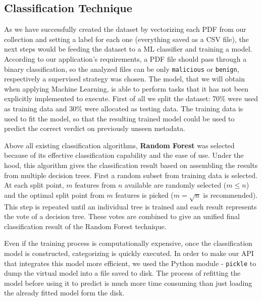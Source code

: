\subsection{Classification Technique}
As we have successfully created the dataset by vectorizing each PDF from our collection and setting a label for each one (everything saved as a CSV file), the next steps would be feeding the dataset to a ML classifier and training a model. According to our application's requirements, a PDF file should pass through a binary classification, so the analyzed files can be only \texttt{malicious} or \texttt{benign}, respectively a supervised strategy was chosen. The model, that we will obtain when applying Machine Learning, is able to perform tasks that it has not been explicitly implemented to execute. First of all we split the dataset: 70\% were used as training data and 30\% were allocated as testing data. The training data is used to fit the model, so that the resulting trained model could be used to predict the correct verdict on previously unseen metadata. \par 
Above all existing classification algorithms, \textbf{Random Forest} was selected because of its effective classification capability and the ease of use. Under the hood, this algorithm gives the classification result based on assembling the results from multiple decision trees. First a random subset from training data is selected. At each split point, $m$ features from $n$ available are randomly selected ($m \leqslant n$) and the optimal split point from $m$ features is picked ($m = \sqrt{n}$ is recommended). This step is repeated until an individual tree is trained and each result represents the vote of a decision tree. These votes are combined to give an unified final classification result of the Random Forest technique. \par
Even if the training process is computationally expensive, once the classification model is constructed, categorizing is quickly executed. In order to make our API that integrates this model more efficient, we used the Python module - \texttt{pickle} to dump the virtual model into a file saved to disk. The process of refitting the model before using it to predict is much more time consuming than just loading the already fitted model form the disk.


